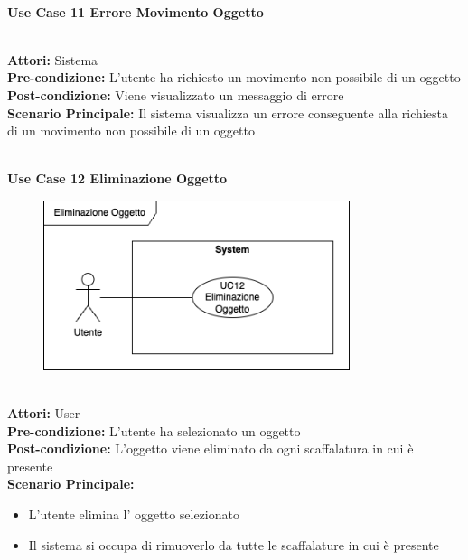 \vspace{0.5cm}

\Large\textbf{}\\
\Large\textbf{Use Case 11 Errore Movimento Oggetto} \\

\vspace{0.5cm}

\large\textbf{} \\
\textbf{Attori:} Sistema\\
\textbf{Pre-condizione:} L'utente ha richiesto un movimento non possibile di un oggetto  \\
\textbf{Post-condizione: } Viene visualizzato un messaggio di errore\\
\textbf{Scenario Principale:} 
Il sistema visualizza un errore conseguente alla richiesta di un movimento non possibile di un oggetto

\vspace{0.5cm}

\Large\textbf{}\\
\Large\textbf{Use Case 12 Eliminazione Oggetto} \\
\begin{figure}[h]
  \centering
  \includegraphics[width=0.8\textwidth]{UseCasesImages/ObjDelete.drawio.png}
\end{figure}
\vspace{0.5cm}

\large\textbf{} \\
\textbf{Attori:} User\\
\textbf{Pre-condizione:} L'utente ha selezionato un oggetto  \\
\textbf{Post-condizione: } L'oggetto viene eliminato da ogni scaffalatura in cui è presente\\
\textbf{Scenario Principale:} 
\begin{itemize}
    \item L'utente elimina l' oggetto selezionato
    \item Il sistema si occupa di rimuoverlo da tutte le scaffalature in cui è presente 
\end{itemize}


{}

\vspace{0.5cm}
